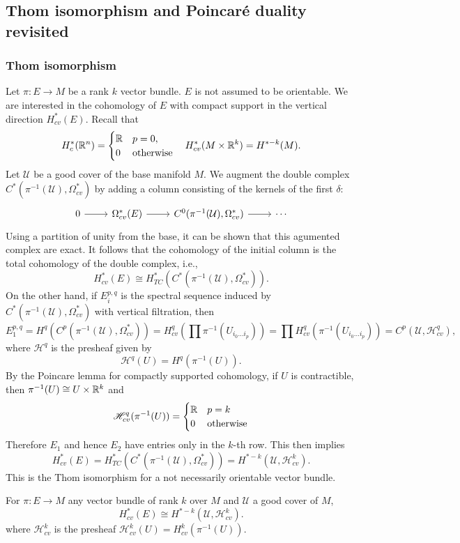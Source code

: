 \subsection{Thom isomorphism and Poincar\'e duality revisited}
\subsubsection{Thom isomorphism}
Let $\pi:E\to M$ be a rank $k$ vector bundle. $E$ is not assumed to be orientable. We are interested in the cohomology of $E$ with compact support in the vertical 
direction $H_{cv}^*(E)$. Recall that
\[H^*_{c}(\mathbb{R}^n)=\begin{cases}
\mathbb{R}&p=0,\\
0&\text{otherwise}
\end{cases}\quad H^*_{cv}(M\times\mathbb{R}^k)=H^{*-k}(M).\]
Let $\mathcal{U}$ be a good cover of the base manifold $M$. We augment the double complex $C^*(\pi^{-1}(\mathcal{U}),\Omega^*_{cv})$ by adding a column consisting of 
the kernels of the first $\delta$:
\[\begin{tikzcd}
0\ar[r]&\Omega^*_{cv}(E)\ar[r]&C^0(\pi^{-1}(\mathcal{U}),\Omega^*_{cv})\ar[r]&\cdots
\end{tikzcd}\]
Using a partition of unity from the base, it can be shown that this agumented complex are exact. It follows that the cohomology of the initial column is the total 
cohomology of the double complex, i.e.,
\[H^*_{cv}(E)\cong H_{TC}^*(C^*(\pi^{-1}(\mathcal{U}),\Omega^*_{cv})).\]
On the other hand, if $E_i^{p,q}$ is the spectral sequence induced by $C^*(\pi^{-1}(\mathcal{U}),\Omega^*_{cv})$ with vertical filtration, then
\[E_1^{p,q}=H^q(C^p(\pi^{-1}(\mathcal{U}),\Omega^*_{cv}))=H^q_{cv}(\prod\pi^{-1}(U_{i_0\dots i_p}))=\prod H^q_{cv}(\pi^{-1}(U_{i_0\dots i_p}))=C^p(\mathcal{U},\mathscr{H}^q_{cv}),\]
where $\mathscr{H}^q$ is the presheaf given by
\[\mathscr{H}^q(U)=H^q(\pi^{-1}(U)).\]
By the Poincare lemma for compactly supported cohomology, if $U$ is contractible, then $\pi^{-1}(U)\cong U\times\mathbb{R}^k$ and
\[\mathscr{H}^q_{cv}(\pi^{-1}(U))=\begin{cases}
\mathbb{R}&p=k\\
0&\text{otherwise}
\end{cases}\]
Therefore $E_1$ and hence $E_2$ have entries only in the $k$-th row. This then implies
\[H^*_{cv}(E)=H_{TC}^*(C^*(\pi^{-1}(\mathcal{U}),\Omega^*_{cv}))=H^{*-k}(\mathcal{U},\mathscr{H}^k_{cv}).\]
This is the Thom isomorphism for a not necessarily orientable vector bundle.
\begin{theorem}
For $\pi:E\to M$ any vector bundle of rank $k$ over $M$ and $\mathcal{U}$ a good cover of $M$,
\[H^*_{cv}(E)\cong H^{*-k}(\mathcal{U},\mathscr{H}^k_{cv}).\]
where $\mathscr{H}^k_{cv}$ is the presheaf $\mathscr{H}^k_{cv}(U)=H^k_{cv}(\pi^{-1}(U))$.
\end{theorem}
